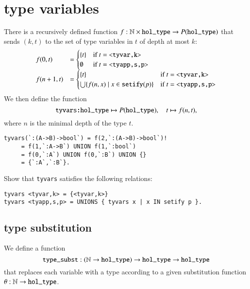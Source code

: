 \section{type variables}




There is a recursively defined function $f:\ring{N}\times \verb!hol_type!\to P(\verb!hol_type!)$ that sends $(k,t)$ to the set of type variables in $t$ of depth at most $k$:
$$
\begin{array}{lll}
f(0,t) &= \begin{cases} \{t\} &\hbox{if } t = \verb!<tyvar,k>!\\ \emptyset &\hbox{if } t = \verb!<tyapp,s,p>!\end{cases}\\
f(n+1,t) &= \begin{cases} \{t\} &\hbox{if } t= \verb!<tyvar,k>!\\ \bigcup\{ f(n,x) \mid x \in \verb!setify!(p) \} &\hbox{if } t = \verb!<tyapp,s,p>!\end{cases}\\
\end{array}
$$
We then define the function
$$
\verb!tyvars:hol_type!\mapsto P(\verb!hol_type!),\quad
t \mapsto f(n,t),
$$
where $n$ is the minimal depth of the type $t$.

\begin{example}
\begin{verbatim}
tyvars(`:(A->B)->bool`) = f(2,`:(A->B)->bool`)! 
     = f(1,`:A->B`) UNION f(1,`:bool`)
     = f(0,`:A`) UNION f(0,`:B`) UNION {}
     = {`:A`,`:B`}.
\end{verbatim}
\end{example}

\begin{exer}\label{ex:tyvars} 
Show that \verb!tyvars! satisfies the following relations:
\begin{verbatim}
tyvars <tyvar,k> = {<tyvar,k>}
tyvars <tyapp,s,p> = UNIONS { tyvars x | x IN setify p }.
\end{verbatim}
\end{exer}

\subsection{type substitution}

We define a function
$$
\verb!type_subst!:(\ring{N}\to \verb!hol_type!)\to \verb!hol_type! \to \verb!hol_type!
$$
that replaces each variable with a type according to a given substitution function $\theta:\ring{N}\to \verb!hol_type!$.

